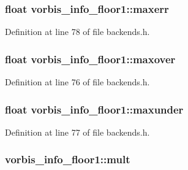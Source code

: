 \subsubsection[{\texorpdfstring{maxerr}{maxerr}}]{\setlength{\rightskip}{0pt plus 5cm}float vorbis\+\_\+info\+\_\+floor1\+::maxerr}\hypertarget{structvorbis__info__floor1_a0119a5a0436ab3751c5c51c6e02098f6}{}\label{structvorbis__info__floor1_a0119a5a0436ab3751c5c51c6e02098f6}


Definition at line 78 of file backends.\+h.

\subsubsection[{\texorpdfstring{maxover}{maxover}}]{\setlength{\rightskip}{0pt plus 5cm}float vorbis\+\_\+info\+\_\+floor1\+::maxover}\hypertarget{structvorbis__info__floor1_ab582f5329d8755a0241d98b42a686ee4}{}\label{structvorbis__info__floor1_ab582f5329d8755a0241d98b42a686ee4}


Definition at line 76 of file backends.\+h.

\subsubsection[{\texorpdfstring{maxunder}{maxunder}}]{\setlength{\rightskip}{0pt plus 5cm}float vorbis\+\_\+info\+\_\+floor1\+::maxunder}\hypertarget{structvorbis__info__floor1_a910797f6fa710faef66f673ed9752fc7}{}\label{structvorbis__info__floor1_a910797f6fa710faef66f673ed9752fc7}


Definition at line 77 of file backends.\+h.

\subsubsection[{\texorpdfstring{mult}{mult}}]{ vorbis\+\_\+info\+\_\+floor1\+::mult}\hypertarget{structvorbis__info__floor1_a431d5bb1a6aec9746726cfdf737d5ac0}{}\label{structvorbis__info__floor1_a431d5bb1a6aec9746726cfdf737d5ac0}


